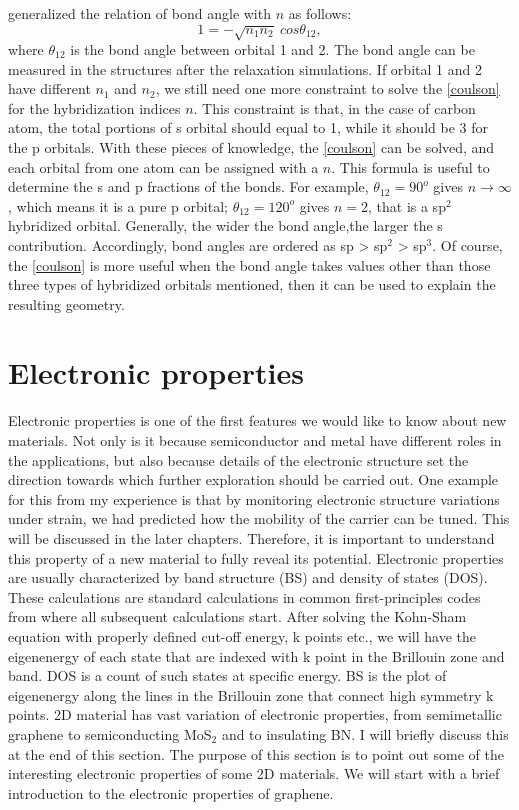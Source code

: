 \citet{coulson1949} generalized the relation of bond angle with $n$ as follows:
\begin{equation}\label{coulson}
1=-\sqrt{n_1n_2}~cos\theta_{12}, 
\end{equation}
where $\theta_{12}$ is the bond angle between orbital 1 and 2. The bond angle can be measured in the structures after the relaxation simulations. If orbital 1 and 2 have different $n_1$ and $n_2$, we still need one more constraint to solve the \autoref{coulson} for the hybridization indices $n$. This constraint is that, in the case of carbon atom, the total portions of s orbital should equal to 1, while it should be 3 for the p orbitals. With these pieces of knowledge, the \autoref{coulson} can be solved, and each orbital from one atom can be assigned with a $n$. This formula is useful to determine the s and p fractions of the bonds. For example, $\theta_{12}=90^o$ gives $n\rightarrow\infty$, which means it is a pure p orbital; $\theta_{12}=120^o$ gives $n=2$, that is a sp$^2$ hybridized orbital. Generally, the wider the bond angle,the larger the s contribution. Accordingly, bond angles are ordered as sp > sp$^2$ > sp$^3$. Of course, the \autoref{coulson} is more useful when the bond angle takes values other than those three types of hybridized orbitals mentioned, then it can be used to explain the resulting geometry.

\section{Electronic properties}

Electronic properties is one of the first features we would like to know about new materials. Not only is it because semiconductor and metal have different roles in the applications, but also because details of the electronic structure set the direction towards which further exploration should be carried out. One example for this from my experience is that by monitoring electronic structure variations under strain, we had predicted how the mobility of the carrier can be tuned. This will be discussed in the later chapters. Therefore, it is important to understand this property of a new material to fully reveal its potential. Electronic properties are usually characterized by band structure (BS) and density of states (DOS). These calculations are standard calculations in common first-principles codes from where all subsequent calculations start. After solving the Kohn-Sham equation with properly defined cut-off energy, k points etc., we will have the eigenenergy of each state that are indexed with k point in the Brillouin zone and band.  DOS is a count of such states at specific energy. BS is the plot of eigenenergy along the lines in the Brillouin zone that connect high symmetry k points.  2D material has vast variation of electronic properties, from semimetallic graphene to semiconducting MoS$_2$ and to insulating BN. I will briefly discuss this at the end of this section. The purpose of this section is to point out some of the interesting electronic properties of some 2D materials. We will start with a brief introduction to the electronic properties of graphene.

